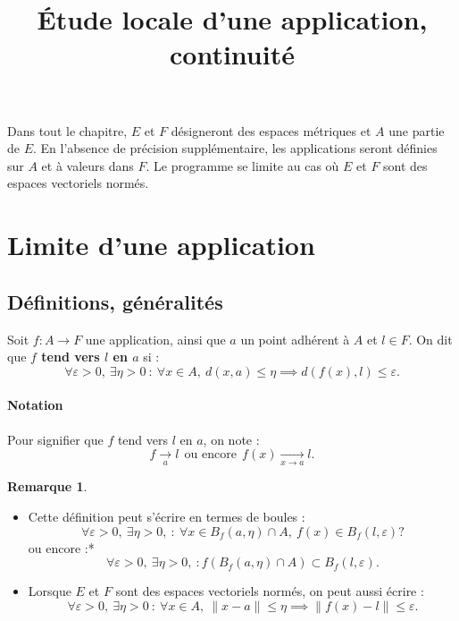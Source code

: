 \documentclass[french]{article}
\title{Étude locale d'une application, continuité}
\date{}
\theoremstyle{plain}
\theoremstyle{definition}
\newtheorem*{rmq}{Remarque}
\theoremstyle{remark}
\begin{document}
\tableofcontents

\newpage
\maketitle

Dans tout le chapitre, $E$ et $F$ désigneront des espaces métriques et $A$ une partie de $E$. En l'absence de précision supplémentaire, les applications seront définies sur $A$ et à valeurs dans $F$. Le programme se limite au cas où $E$ et $F$ sont des espaces vectoriels normés.

\section{Limite d'une application}
\subsection{Définitions, généralités}

\begin{dfn}
	Soit $f:A\to F$ une application, ainsi que $a$ un point adhérent à $A$ et $l\in F$. On dit que \textbf{$f$ tend vers $l$ en $a$} si : $$\forall\varepsilon>0,\ \exists\eta>0\ :\ \forall x\in A,\ d(x,a)\leqslant\eta\implies d(f(x),l)\leqslant\varepsilon.$$
\end{dfn}

\paragraph{Notation} Pour signifier que $f$ tend vers $l$ en $a$, on note :
$$f\xrightarrow[a]{}l\ \ \text{ou encore}\ \ f(x)\xrightarrow[x\to a]{}l.$$

\begin{rmq}
	\begin{itemize}
		\item Cette définition peut s'écrire en termes de boules :
		$$\forall\varepsilon>0,\ \exists\eta>0,\ : \ \forall x\in B_f(a,\eta)\cap A,\ f(x)\in B_f(l,\varepsilon)?$$ ou encore :*
		$$\forall\varepsilon>0,\ \exists\eta>0,\ : f(B_f(a,\eta)\cap A)\subset B_f(l,\varepsilon).$$
		\item Lorsque $E$ et $F$ sont des espaces vectoriels normés, on peut aussi écrire : 
		$$\forall\varepsilon>0,\ \exists\eta>0\ :\ \forall x\in A,\ \lVert x-a\rVert\leqslant\eta\implies \lVert f(x)-l\rVert\leqslant\varepsilon.$$
	\end{itemize}
\end{rmq}
\end{document}

